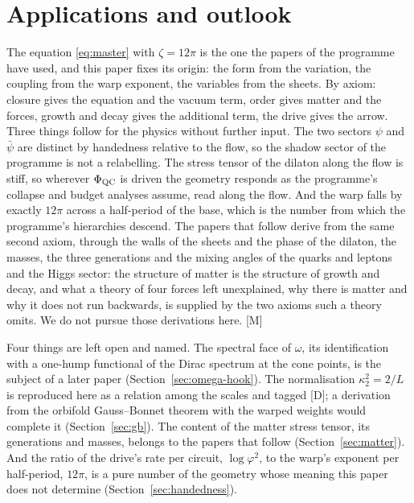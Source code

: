 \documentclass[11pt,a4paper]{article}
\theoremstyle{plain}
\theoremstyle{definition}
\theoremstyle{remark}
\newcommand{\rigD}{[\textup{D}]}
\newcommand{\rigM}{[\textup{M}]}
\begin{document}






\section{Applications and outlook}\label{sec:outlook}

The equation \eqref{eq:master} with $\zeta=12\pi$ is the one the papers of the programme have used, and this paper fixes its origin: the form from the variation, the coupling from the warp exponent, the variables from the sheets. By axiom: closure gives the equation and the vacuum term, order gives matter and the forces, growth and decay gives the additional term, the drive gives the arrow. Three things follow for the physics without further input. The two sectors $\psi$ and $\bar\psi$ are distinct by handedness relative to the flow, so the shadow sector of the programme is not a relabelling. The stress tensor of the dilaton along the flow is stiff, so wherever $\Phi_{\mathrm{QC}}$ is driven the geometry responds as the programme's collapse and budget analyses assume, read along the flow. And the warp falls by exactly $12\pi$ across a half-period of the base, which is the number from which the programme's hierarchies descend. The papers that follow derive from the same second axiom, through the walls of the sheets and the phase of the dilaton, the masses, the three generations and the mixing angles of the quarks and leptons and the Higgs sector: the structure of matter is the structure of growth and decay, and what a theory of four forces left unexplained, why there is matter and why it does not run backwards, is supplied by the two axioms such a theory omits. We do not pursue those derivations here. \rigM

Four things are left open and named. The spectral face of $\omega$, its identification with a one-hump functional of the Dirac spectrum at the cone points, is the subject of a later paper (Section~\ref{sec:omega-hook}). The normalisation $\kappa_{2}^{2}=2/L$ is reproduced here as a relation among the scales and tagged \rigD; a derivation from the orbifold Gauss--Bonnet theorem with the warped weights would complete it (Section~\ref{sec:gb}). The content of the matter stress tensor, its generations and masses, belongs to the papers that follow (Section~\ref{sec:matter}). And the ratio of the drive's rate per circuit, $\log\varphi^{2}$, to the warp's exponent per half-period, $12\pi$, is a pure number of the geometry whose meaning this paper does not determine (Section~\ref{sec:handedness}).
\end{document}

